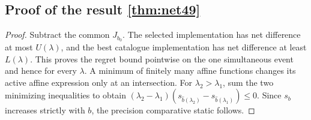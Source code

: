 \subsection{Proof of the result \ref{thm:net49}}\label{supp:proof-decisions49-3}
\begin{proof}
Subtract the common $J_{b_0}$. The selected implementation has net difference at most $U(\lambda)$, and the best catalogue implementation has net difference at least $L(\lambda)$. This proves the regret bound pointwise on the one simultaneous event and hence for every $\lambda$. A minimum of finitely many affine functions changes its active affine expression only at an intersection. For $\lambda_2>\lambda_1$, sum the two minimizing inequalities to obtain $(\lambda_2-\lambda_1)(s_{\widehat b(\lambda_2)}-s_{\widehat b(\lambda_1)})\le0$. Since $s_b$ increases strictly with $b$, the precision comparative static follows.
\end{proof}
